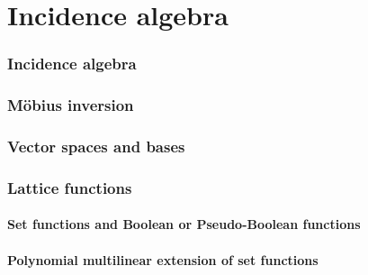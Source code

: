 \chapter{Incidence algebra}
\subsection{Incidence algebra}
\subsection{M\"obius inversion}
\subsection{Vector spaces and bases}
\subsection{Lattice functions}
\subsubsection{Set functions and Boolean or Pseudo-Boolean functions}
\subsubsection{Polynomial multilinear extension of set functions}

